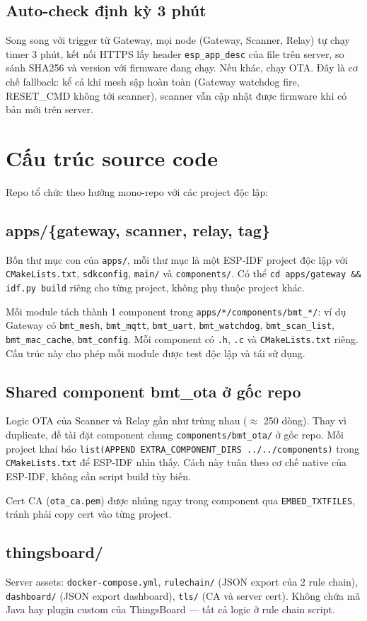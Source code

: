 \subsection{Auto-check định kỳ 3 phút}

Song song với trigger từ Gateway, mọi node (Gateway, Scanner, Relay) tự chạy timer 3 phút, kết nối HTTPS lấy header \texttt{esp\_app\_desc} của file trên server, so sánh SHA256 và version với firmware đang chạy. Nếu khác, chạy OTA. Đây là cơ chế fallback: kể cả khi mesh sập hoàn toàn (Gateway watchdog fire, RESET\_CMD không tới scanner), scanner vẫn cập nhật được firmware khi có bản mới trên server.

\section{Cấu trúc source code}

Repo tổ chức theo hướng mono-repo với các project độc lập:

\subsection{apps/\{gateway, scanner, relay, tag\}}

Bốn thư mục con của \texttt{apps/}, mỗi thư mục là một ESP-IDF project độc lập với \texttt{CMakeLists.txt}, \texttt{sdkconfig}, \texttt{main/} và \texttt{components/}. Có thể \texttt{cd apps/gateway \&\& idf.py build} riêng cho từng project, không phụ thuộc project khác.

Mỗi module tách thành 1 component trong \texttt{apps/*/components/bmt\_*/}: ví dụ Gateway có \texttt{bmt\_mesh}, \texttt{bmt\_mqtt}, \texttt{bmt\_uart}, \texttt{bmt\_watchdog}, \texttt{bmt\_scan\_list}, \texttt{bmt\_mac\_cache}, \texttt{bmt\_config}. Mỗi component có \texttt{.h}, \texttt{.c} và \texttt{CMakeLists.txt} riêng. Cấu trúc này cho phép mỗi module được test độc lập và tái sử dụng.

\subsection{Shared component bmt\_ota ở gốc repo}

Logic OTA của Scanner và Relay gần như trùng nhau ($\approx$ 250 dòng). Thay vì duplicate, đề tài đặt component chung \texttt{components/bmt\_ota/} ở gốc repo. Mỗi project khai báo \texttt{list(APPEND EXTRA\_COMPONENT\_DIRS ../../components)} trong \texttt{CMakeLists.txt} để ESP-IDF nhìn thấy. Cách này tuân theo cơ chế native của ESP-IDF, không cần script build tùy biến.

Cert CA (\texttt{ota\_ca.pem}) được nhúng ngay trong component qua \texttt{EMBED\_TXTFILES}, tránh phải copy cert vào từng project.

\subsection{thingsboard/}

Server assets: \texttt{docker-compose.yml}, \texttt{rulechain/} (JSON export của 2 rule chain), \texttt{dashboard/} (JSON export dashboard), \texttt{tls/} (CA và server cert). Không chứa mã Java hay plugin custom của ThingsBoard — tất cả logic ở rule chain script.
